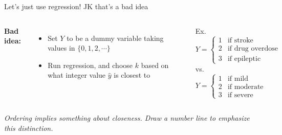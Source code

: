 \documentclass[aspectratio=169,usenames,dvipsnames]{beamer}
\newcommand{\InstructorNotes}[1]{\textit{\color{orange}#1}}
\begin{document}
	\begin{frame}[t]{Let's just use regression!}
		{JK that's a bad idea}
	
	\begin{columns}
	\centering
	\textbf{Bad idea:}
	\begin{itemize}
		\item Set $Y$ to be a dummy variable taking values in $\{0,1,2,\cdots\}$
		\item Run regression, and choose $k$ based on what integer value $\hat y$ is closest to
	\end{itemize}
	
	Ex.
	\begin{equation*}
		Y =
		\begin{cases}
			1 & \text{if stroke }\\
			2 & \text{if drug overdose }\\
			3 & \text{if epileptic seizure}
		\end{cases}
	\end{equation*}
	vs.
	\begin{equation*}
		Y =
		\begin{cases}
			1 & \text{if mild }\\
			2 & \text{if moderate }\\
			3 & \text{if severe}
		\end{cases}
	\end{equation*}
	\end{columns}
	\InstructorNotes{Ordering implies something about closeness. Draw a number line to emphasize this distinction. }
	\end{frame}
\end{document}
